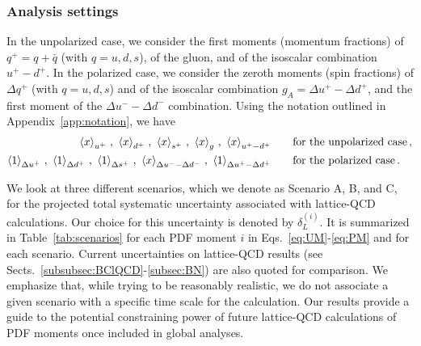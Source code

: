 \subsubsection{Analysis settings}
\label{sec:projections:settings}

In the unpolarized case,  we consider
the first moments (momentum fractions) of $q^+=q+\bar{q}$ (with $q=u,d,s$),
of the gluon, and of the isoscalar combination $u^+-d^+$.
%
In the polarized case, we consider the zeroth moments (spin fractions) 
of $\Delta q^+$ (with $q=u,d,s$) and of the isoscalar combination 
$g_A=\Delta u^+-\Delta d^+$, and the first moment of the 
$\Delta u^- - \Delta d^-$ combination.
%
Using the notation outlined in Appendix~\ref{app:notation}, we have
\begin{align}
\left\langle x\right\rangle_{u^+}\, , \
\left\langle x\right\rangle_{d^+}\, , \
\left\langle x\right\rangle_{s^+}\, , \
\left\langle x\right\rangle_{g}\, ,  \
\left\langle x\right\rangle_{u^+-d^+} & \qquad\text{for the unpolarized case} \, ,
\label{eq:UM}\\
\left\langle 1\right\rangle_{\Delta u^+}\, , \
\left\langle 1\right\rangle_{\Delta d^+}\, , \
\left\langle 1\right\rangle_{\Delta s^+}\, , \
\left\langle x\right\rangle_{\Delta u^--\Delta d^-}\, ,\
\left\langle 1\right\rangle_{\Delta u^+ - \Delta d^+} & \qquad\text{for the polarized case}\, .
\label{eq:PM}
\end{align}

We look at three different scenarios, which we denote
as Scenario A, B, and C, for the projected total systematic
uncertainty associated with lattice-QCD calculations.
%
Our choice for this uncertainty is denoted by $\delta_L^{(i)}$.
%
It is summarized in Table~\ref{tab:scenarios} for each PDF moment $i$ in 
Eqs.~\eqref{eq:UM}-\eqref{eq:PM} and for each scenario.
%
Current uncertainties on lattice-QCD results 
(see Sects.~\ref{subsubsec:BClQCD}-\ref{subsec:BN})
are also quoted for comparison.
%
We emphasize that, while trying to be reasonably
realistic, we do not associate a given scenario
with a specific time scale for the calculation.
%
Our results provide a guide to the potential
constraining power of future lattice-QCD calculations
of PDF moments once included in global analyses. 
 
